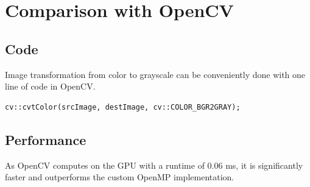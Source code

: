 \section{Comparison with OpenCV}

\subsection{Code}

\noindent
Image transformation from color to grayscale can be conveniently done with one line of code in OpenCV.

\begin{listing}[H]
    \begin{verbatim}
cv::cvtColor(srcImage, destImage, cv::COLOR_BGR2GRAY);
    \end{verbatim}
    \label{listing:grayscale_opencv}
\end{listing}

\subsection{Performance}

\noindent
As OpenCV computes on the GPU with a runtime of $ 0.06 $ ms, it is significantly faster and outperforms the custom OpenMP implementation.